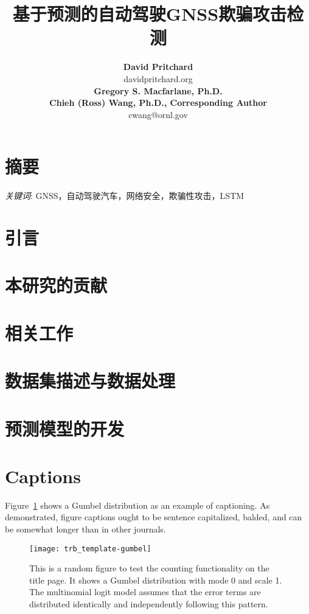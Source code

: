 \documentclass{trbunofficial}
\title{基于预测的自动驾驶GNSS欺骗攻击检测}
\author{%
  \textbf{David Pritchard}\\
  davidpritchard.org\\
  \hfill\break%
  \textbf{Gregory S. Macfarlane, Ph.D.}\\
  \hfill\break%
  \textbf{Chieh (Ross) Wang, Ph.D., Corresponding Author}\\
  cwang@ornl.gov
}
\begin{document}
\maketitle

\section{摘要}



\hfill\break%
\noindent\textit{关键词}: GNSS，自动驾驶汽车，网络安全，欺骗性攻击，LSTM
\newpage

\section{引言}



\section{本研究的贡献}



\section{相关工作}


\section{数据集描述与数据处理}


\section{预测模型的开发}


\section{Captions}
Figure~\ref{fig:trial} shows a Gumbel distribution as an example of captioning. As demonstrated, figure captions ought to be sentence capitalized, balded, and can be somewhat longer than in other journals.

\begin{figure}[!ht]
  \centering
  \texttt{[image: trb\_template-gumbel]}
  \caption{This is a random figure to test the counting functionality on the title page. It shows a Gumbel distribution with mode 0 and scale 1. The multinomial logit model assumes that the error terms are distributed identically and independently following this pattern.}\label{fig:trial}
\end{figure}
\end{document}
